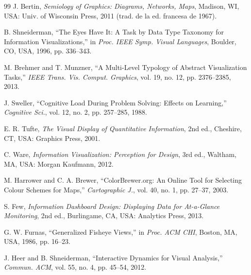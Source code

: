 \documentclass[journal,twocolumn,spanish]{IEEEtran}
\begin{document}
\begin{thebibliography}{99}
J. Bertin, \emph{Semiology of Graphics: Diagrams, Networks, Maps}, Madison, WI, USA: Univ. of Wisconsin Press, 2011 (trad. de la ed. francesa de 1967).

B. Shneiderman, ``The Eyes Have It: A Task by Data Type Taxonomy for Information Visualizations,'' in \emph{Proc. IEEE Symp. Visual Languages}, Boulder, CO, USA, 1996, pp. 336--343.

M. Brehmer and T. Munzner, ``A Multi-Level Typology of Abstract Visualization Tasks,'' \emph{IEEE Trans. Vis. Comput. Graphics}, vol. 19, no. 12, pp. 2376--2385, 2013.

J. Sweller, ``Cognitive Load During Problem Solving: Effects on Learning,'' \emph{Cognitive Sci.}, vol. 12, no. 2, pp. 257--285, 1988.

E. R. Tufte, \emph{The Visual Display of Quantitative Information}, 2nd ed., Cheshire, CT, USA: Graphics Press, 2001.

C. Ware, \emph{Information Visualization: Perception for Design}, 3rd ed., Waltham, MA, USA: Morgan Kaufmann, 2012.

M. Harrower and C. A. Brewer, ``ColorBrewer.org: An Online Tool for Selecting Colour Schemes for Maps,'' \emph{Cartographic J.}, vol. 40, no. 1, pp. 27--37, 2003.

S. Few, \emph{Information Dashboard Design: Displaying Data for At-a-Glance Monitoring}, 2nd ed., Burlingame, CA, USA: Analytics Press, 2013.

G. W. Furnas, ``Generalized Fisheye Views,'' in \emph{Proc. ACM CHI}, Boston, MA, USA, 1986, pp. 16--23.

J. Heer and B. Shneiderman, ``Interactive Dynamics for Visual Analysis,'' \emph{Commun. ACM}, vol. 55, no. 4, pp. 45--54, 2012.

\end{thebibliography}
\end{document}
